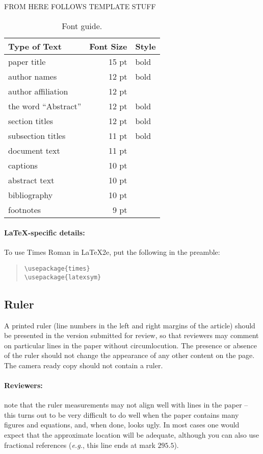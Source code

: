 \documentclass[11pt,a4paper]{article}
\begin{document}
FROM HERE FOLLOWS TEMPLATE STUFF

\begin{table}
\centering
\begin{tabular}{lrl}
\hline \textbf{Type of Text} & \textbf{Font Size} & \textbf{Style} \\ \hline
paper title & 15 pt & bold \\
author names & 12 pt & bold \\
author affiliation & 12 pt & \\
the word ``Abstract'' & 12 pt & bold \\
section titles & 12 pt & bold \\
subsection titles & 11 pt & bold \\
document text & 11 pt  &\\
captions & 10 pt & \\
abstract text & 10 pt & \\
bibliography & 10 pt & \\
footnotes & 9 pt & \\
\hline
\end{tabular}
\caption{\label{font-table} Font guide. }
\end{table}

\paragraph{\LaTeX-specific details:}
To use Times Roman in \LaTeX2e{}, put the following in the preamble:
\begin{quote}
\small
\begin{verbatim}
\usepackage{times}
\usepackage{latexsym}
\end{verbatim}
\end{quote}


\subsection{Ruler}
A printed ruler (line numbers in the left and right margins of the article) should be presented in the version submitted for review, so that reviewers may comment on particular lines in the paper without circumlocution.
The presence or absence of the ruler should not change the appearance of any other content on the page.
The camera ready copy should not contain a ruler.

\paragraph{Reviewers:}
note that the ruler measurements may not align well with lines in the paper -- this turns out to be very difficult to do well when the paper contains many figures and equations, and, when done, looks ugly.
In most cases one would expect that the approximate location will be adequate, although you can also use fractional references (\emph{e.g.}, this line ends at mark $295.5$).
\end{document}
